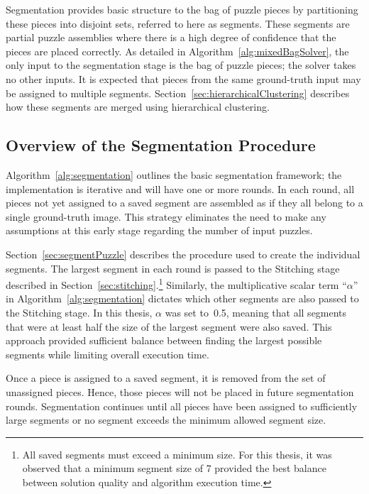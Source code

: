 Segmentation provides basic structure to the bag of puzzle pieces by partitioning these pieces into disjoint sets, referred to here as segments.  These segments are partial puzzle assemblies where there is a high degree of confidence that the pieces are placed correctly. As detailed in Algorithm~\ref{alg:mixedBagSolver}, the only input to the segmentation stage is the bag of puzzle pieces; the solver takes no other inputs.  It is expected that pieces from the same ground-truth input may be assigned to multiple segments.  Section~\ref{sec:hierarchicalClustering} describes how these segments are merged using hierarchical clustering.

\subsection{Overview of the Segmentation Procedure}

Algorithm~\ref{alg:segmentation} outlines the basic segmentation framework; the implementation is iterative and will have one or more rounds.  In each round, all pieces not yet assigned to a saved segment are assembled as if they all belong to a single ground-truth image.  This strategy eliminates the need to make any assumptions at this early stage regarding the number of input puzzles. 

Section~\ref{sec:segmentPuzzle} describes the procedure used to create the individual segments. The largest segment in each round is passed to the Stitching stage described in Section~\ref{sec:stitching}.\footnote{All saved segments must exceed a minimum size.  For this thesis, it was observed that a minimum segment size of 7 provided the best balance between solution quality and algorithm execution time.} Similarly, the multiplicative scalar term ``\textit{$\alpha$}'' in Algorithm~\ref{alg:segmentation} dictates which other segments are also passed to the Stitching stage.  In this thesis, \textit{$\alpha$} was set to~0.5, meaning that all segments that were at least half the size of the largest segment were also saved.  This approach provided sufficient balance between finding the largest possible segments while limiting overall execution time.

Once a piece is assigned to a saved segment, it is removed from the set of unassigned pieces.  Hence, those pieces will not be placed in future segmentation rounds.  Segmentation continues until all pieces have been assigned to sufficiently large segments or no segment exceeds the minimum allowed segment size.

